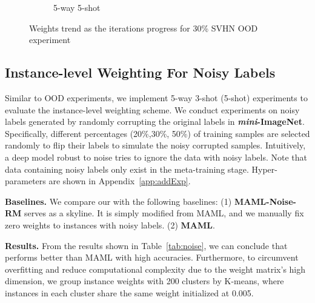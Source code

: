 \begin{figure}[!t]
\begin{subfigure}[b]{0.23\textwidth}
        \caption{5-way 5-shot}
    \end{subfigure}
    \vspace{-3mm}
    \caption{Weights trend as the iterations progress for 30\% SVHN OOD experiment}
    \label{fig:svhn_wt_itera}
\end{figure}
\vspace{-1.5ex}

\subsection{Instance-level Weighting For Noisy Labels}
\label{sec:exp_instance-level}
\vspace{-1mm}
Similar to OOD experiments, we implement 5-way 3-shot (5-shot) experiments to evaluate the instance-level weighting scheme. We conduct experiments on noisy labels generated by randomly corrupting the original labels in \textbf{\textit{mini}-ImageNet}. Specifically, different percentages (20\%,30\%, 50\%) of training samples are selected randomly to flip their labels to simulate the noisy corrupted samples.  Intuitively, a deep model robust to noise tries to ignore the data with noisy labels. Note that data containing noisy labels only exist in the meta-training stage. Hyper-parameters are shown in Appendix~\ref{app:addExp}. 

\textbf{Baselines.} We compare our \sysname{} with the following baselines: (1) \textbf{MAML-Noise-RM} serves as a skyline. It is simply modified from MAML, and we manually fix zero weights to instances with noisy labels. (2) \textbf{MAML}.

\textbf{Results.} From the results shown in Table~\ref{tab:noise}, we can conclude that \sysname{} performs better than MAML with high accuracies. 
Furthermore, to circumvent overfitting and reduce computational complexity due to the weight matrix's high dimension, we group instance weights with 200 clusters by K-means, where instances in each cluster share the same weight initialized at 0.005. 


